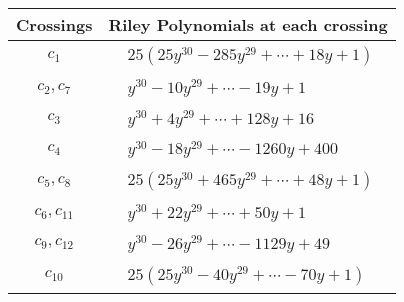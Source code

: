 \documentclass[1p]{elsarticle_modified}
\theoremstyle{definition}
\begin{document}
\begin{tabular}{m{50pt}|m{274pt}}
Crossings & \hspace{64pt}Riley Polynomials at each crossing \\
\hline $$\begin{aligned}c_{1}\end{aligned}$$&$\begin{aligned}
&25(25 y^{30}-285 y^{29}+\cdots+18 y+1)
\end{aligned}$\\
\hline $$\begin{aligned}c_{2},c_{7}\end{aligned}$$&$\begin{aligned}
&y^{30}-10 y^{29}+\cdots-19 y+1
\end{aligned}$\\
\hline $$\begin{aligned}c_{3}\end{aligned}$$&$\begin{aligned}
&y^{30}+4 y^{29}+\cdots+128 y+16
\end{aligned}$\\
\hline $$\begin{aligned}c_{4}\end{aligned}$$&$\begin{aligned}
&y^{30}-18 y^{29}+\cdots-1260 y+400
\end{aligned}$\\
\hline $$\begin{aligned}c_{5},c_{8}\end{aligned}$$&$\begin{aligned}
&25(25 y^{30}+465 y^{29}+\cdots+48 y+1)
\end{aligned}$\\
\hline $$\begin{aligned}c_{6},c_{11}\end{aligned}$$&$\begin{aligned}
&y^{30}+22 y^{29}+\cdots+50 y+1
\end{aligned}$\\
\hline $$\begin{aligned}c_{9},c_{12}\end{aligned}$$&$\begin{aligned}
&y^{30}-26 y^{29}+\cdots-1129 y+49
\end{aligned}$\\
\hline $$\begin{aligned}c_{10}\end{aligned}$$&$\begin{aligned}
&25(25 y^{30}-40 y^{29}+\cdots-70 y+1)
\end{aligned}$\\
\hline
\end{tabular}\\~\\
\end{document}
